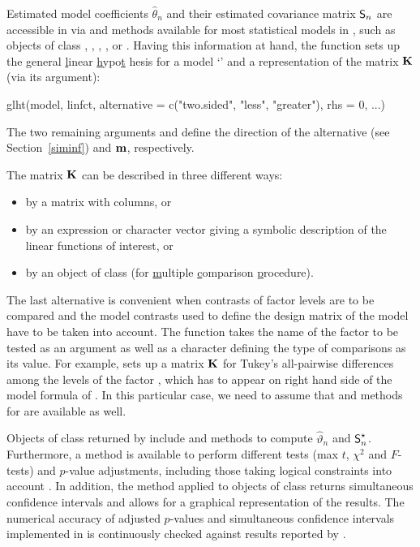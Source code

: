 \documentclass[12pt,a4paper]{article}
\begin{document}
Estimated model coefficients $\hat{\theta}_n$ and their estimated covariance matrix $%
\Sraw$ are accessible in \RR{} via  and 
methods available for most statistical models in \RR, such as objects of
class , , , ,  or %
. Having this information at hand, the  function sets
up the \underline{g}eneral \underline{l}inear \underline{h}ypo\underline{t}%
hesis for a model `' and a representation of the matrix $\mathbf{K}$
(via its  argument): 
\begin{Sinput}
glht(model, linfct, alternative = c("two.sided", "less", "greater"),
     rhs = 0, ...)
\end{Sinput}
The two remaining arguments  and  define the
direction of the alternative (see Section~\ref{siminf}) and $\mathbf{m}$,
respectively.

The matrix $\mathbf{K}$ can be described in three different ways:

\begin{itemize}
\item by a matrix with  columns, or

\item by an expression or character vector giving a symbolic description  of
the linear functions of interest, or

\item by an object of class   (for \underline{m}ultiple 
\underline{c}omparison \underline{p}rocedure).
\end{itemize}

The last alternative is convenient when contrasts of factor levels are to be
compared and the model contrasts used to define the design matrix of the
model have to be taken into account. The  function takes the
name of the factor to be tested as an argument as well as a character
defining the type of comparisons as its value. For example,  sets up a matrix $\mathbf{K}$ for Tukey's all-pairwise differences among
the levels of the factor , which has to appear on right hand
side of the model formula of . In this particular case, we
need to assume that  and  methods
for  are available as well.

Objects of class  returned by  include %
 and  methods to compute $\hat{\vartheta}_n$ and $%
\SK$. Furthermore, a  method is available to perform
different tests (max $t$, $\chi^2$ and $F$-tests) and $p$-value adjustments,
including those taking logical constraints into account \citep{Shaffer1986,
Westfall1997}. In addition, the  method applied to objects
of class  returns simultaneous confidence intervals and allows
for a graphical representation of the results. The numerical accuracy of
adjusted $p$-values and simultaneous confidence intervals implemented in %
 is continuously checked against results reported by \cite%
{Westfall1999}.
\end{document}
